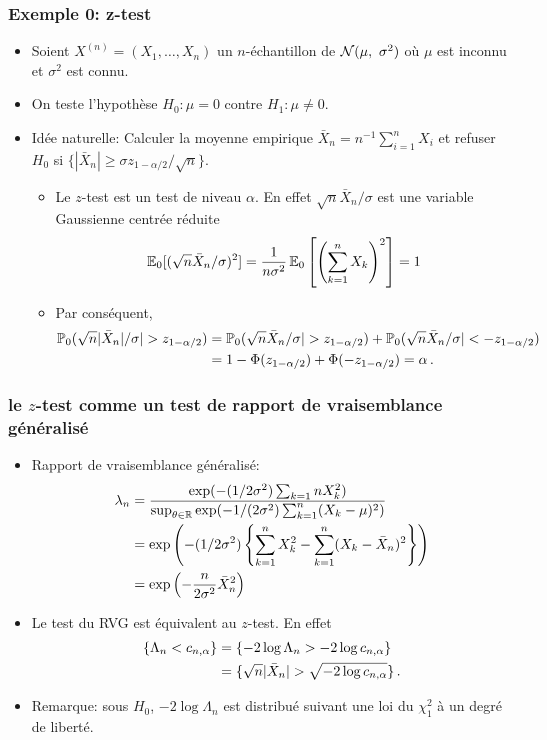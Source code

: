 \begin{frame}
\frametitle{Exemple 0: z-test}
\begin{itemize}
\item  Soient $X^{(n)}= (X_{1}, \dots, X_{n})$ un $n$-échantillon de $\mathcal{N}(\mu,\ \sigma^{2})$ où \alert{$\mu$ est inconnu et $\sigma^2$ est connu}.
\item On teste l'hypothèse $H_0: \mu =0$ contre $H_1: \mu \ne 0$.
\item \alert{Idée naturelle}: Calculer la moyenne empirique $\bar{X}_n= n^{-1} \sum_{i=1}^n X_i$ et refuser $H_0$ si $\{|\bar{X}_n| \geq \sigma z_{1-{\alpha/2}} / \sqrt{n}\}$.
    \begin{itemize}
    \item Le $z$-test est un test de niveau $\alpha$. En effet $\sqrt{n} \bar{X}_n / \sigma$ est une variable Gaussienne centrée réduite
    \[
    \operatorname{{\mathbb E}}_0[(\sqrt{n} \bar{X}_n / \sigma)^2]= \frac{1}{n \sigma^2} \operatorname{{\mathbb E}}_0\left[ \left( \sum_{k=1}^n X_k \right)^2\right] = 1
    \]
    \item Par conséquent,
    \begin{align*}
    \operatorname{{\mathbb P}}_0( \sqrt{n} |\bar{X}_n| / \sigma| > z_{1-\alpha/2})
    &= \operatorname{{\mathbb P}}_0( \sqrt{n} \bar{X}_n / \sigma| > z_{1-\alpha/2}) + \operatorname{{\mathbb P}}_0( \sqrt{n} \bar{X}_n / \sigma| < -z_{1-\alpha/2}) \\
    &= 1 - \Phi(z_{1-\alpha/2}) + \Phi(-z_{1-\alpha/2})= \alpha   \,.
    \end{align*}
    \end{itemize}
\end{itemize}
\end{frame}

\begin{frame}
\frametitle{le $z$-test comme un test de rapport de vraisemblance généralisé}
\begin{itemize}
\item Rapport de vraisemblance généralisé:
\begin{align*}
\lambda_n  
&= \frac{\exp(-(1/2\sigma^2) \sum_{k=1}n X_k^2)}{\sup_{\theta \in \mathbb{R}} \exp(-1/(2\sigma^2) \sum_{k=1}^n (X_k - \mu)^2)} \\ 
&= \exp\left( -(1/2\sigma^2) \left\{ \sum_{k=1}^n X_k^2 - \sum_{k=1}^n (X_k - \bar{X}_n)^2 \right\} \right) \\
&= \exp \left( - \frac{n}{2 \sigma^2} \bar{X}_n^2 \right)
\end{align*}
\item Le test du RVG est équivalent au $z$-test. En effet
\begin{align*}
\{ \Lambda_n  < c_{n,\alpha} \} 
&= \{ - 2 \log \Lambda_n  >  - 2 \log c_{n,\alpha} \} \\
&= \{ \sqrt{n} |\bar{X}_n| > \sqrt{- 2 \log c_{n,\alpha}} \} \,.  
\end{align*}
\item \alert{Remarque:} sous $H_0$, $-2 \log \Lambda_n$ est distribué suivant une loi du $\chi^2_1$ à un degré de liberté.
\end{itemize}
\end{frame}


